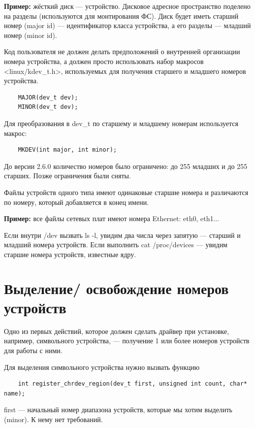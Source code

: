 \textbf{Пример:} жёсткий диск --- устройство. Дисковое адресное пространство поделено на разделы (используются для монтирования ФС). Диск будет иметь старший номер (major id) --- идентификатор класса устройства, а его разделы --- младший номер (minor id).  

Код пользователя не должен делать предположений о внутренней организации номера устройства, а должен просто использовать набор макросов \\ <linux/kdev\_t.h>, используемых для получения старшего и младшего номеров устройства.

\begin{lstlisting}
	MAJOR(dev_t dev);
	MINOR(dev_t dev);
\end{lstlisting}

Для преобразования в dev\_t по старшему и младшему номерам используется макрос:

\begin{lstlisting}
	MKDEV(int major, int minor);
\end{lstlisting}

До версии 2.6.0 количество номеров было ограничено: до 255 младших и до 255 старших. Позже ограничения были сняты.

Файлы устройств одного типа имеют одинаковые старшие номера и различаются по номеру, который добавляется в конец имени. 

\textbf{Пример:} все файлы сетевых плат имеют номера Ethernet: eth0, eth1...

Если внутри /dev вызвать ls -l, увидим два числа через запятую --- старший и младший номера устройств. Если выполнить cat /proc/devices --- увидим старшие номера устройств, известные ядру.

\section{Выделение/ освобождение номеров устройств}

Одно из первых действий, которое должен сделать драйвер при установке, например, символьного устройства, --- получение 1 или более номеров устройств для работы с ними. 

Для выделения символьного устройства нужно вызвать функцию

\begin{lstlisting}
	int register_chrdev_region(dev_t first, unsigned int count, char* name);
\end{lstlisting}

first --- начальный номер диапазона устройств, которые мы хотим выделить (minor). К нему нет требований.


